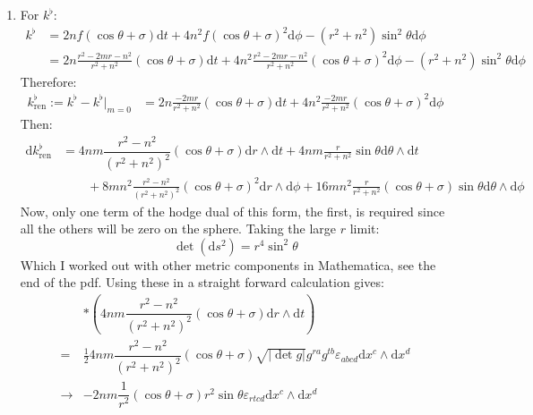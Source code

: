 \documentclass[12pt,a4]{article}
\newcommand{\e}{\mathrm{d}}
\begin{document}
\begin{enumerate}
\begin{enumerate}
      \item
        For $k^\flat$:
        \begin{align*}
          k^\flat &= 2 n f (\cos \theta + \sigma) \e t + 4 n^2 f (\cos \theta + \sigma)^2 \e \phi- (r^2 + n ^2) \sin^2 \theta \e \phi\\
                  &= 2 n \frac{r^2 - 2m r - n^2}{r^2 + n^2} (\cos \theta + \sigma) \e t + 4 n^2 \frac{r^2 - 2m r - n^2}{r^2 + n^2} (\cos \theta + \sigma)^2 \e \phi- (r^2 + n ^2) \sin^2 \theta \e \phi
        \end{align*}
        Therefore:
        \begin{align*}
          k^\flat_{\text{ren}} :=
                  k^\flat - k^\flat |_{m = 0}
                  &= 2 n \frac{- 2m r }{r^2 + n^2} (\cos \theta + \sigma) \e t + 4 n^2 \frac{- 2m r }{r^2 + n^2} (\cos \theta + \sigma)^2 \e \phi 
        \end{align*}
        Then:
        \begin{align*}
          \e k^\flat_{\text{ren}} 
              &= 4 nm \dfrac{r^2-n^2}{\left(r^2+n^2\right)^2}(\cos \theta + \sigma) \e r \wedge \e t + 4 n m\frac{ r }{r^2 + n^2} \sin \theta \e \theta \wedge \e t \\
              &\qquad + 8 m n^2 \frac{ r^2 - n^2 }{(r^2 + n^2)^2} (\cos \theta + \sigma)^2 \e r \wedge \e \phi + 16 m n^2 \frac{r }{r^2 + n^2} (\cos \theta + \sigma)\sin\theta \e \theta \wedge \e \phi 
        \end{align*}
        Now, only one term of the hodge dual of this form, the first, is required since all the others will be zero on the sphere.
        Taking the large $r$ limit:
        \begin{equation*}
          \det(\e s^2) = r^4 \sin^2 \theta
        \end{equation*}
        Which I worked out with other metric components in Mathematica, see the end of the pdf.
        Using these in a straight forward calculation gives:
        \begin{align*}
            & *\left(4 nm \dfrac{r^2-n^2}{\left(r^2+n^2\right)^2}(\cos \theta + \sigma) \e r \wedge \e t\right)\\
          = &\frac{1}{2}4 nm \dfrac{r^2-n^2}{\left(r^2+n^2\right)^2}(\cos \theta + \sigma)\sqrt{|\det g|} g^{r a} g^{t b} \varepsilon_{abcd} \e x^c \wedge \e x^d \\
        \to & - 2 nm \dfrac{1}{r^2}(\cos \theta + \sigma)r^2 \sin \theta \varepsilon_{rtcd} \e x^c \wedge \e x^d\\

\end{align*}
\end{enumerate}
\end{enumerate}
\end{document}
